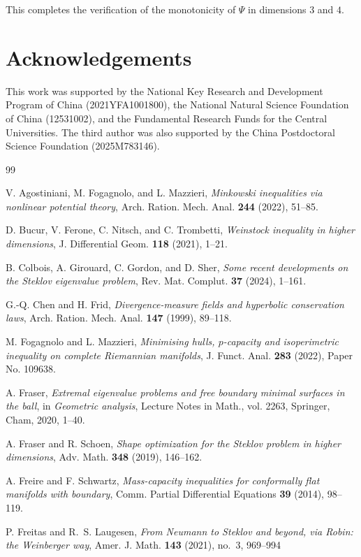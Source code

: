 \documentclass[11pt,reqno]{amsart}
\numberwithin{equation}{section}
\theoremstyle{definition}
\begin{document}
This completes the verification of the monotonicity of $\Psi$ in
dimensions $3$ and $4$.


\section*{Acknowledgements}
This work was supported by the National Key Research and Development Program of China (2021YFA1001800), the National Natural Science Foundation of China (12531002), and the Fundamental Research Funds for the Central Universities.  The third author was also supported by the China Postdoctoral Science Foundation (2025M783146).

\begin{thebibliography}{99}

V. Agostiniani, M. Fogagnolo, and L. Mazzieri,
\emph{Minkowski inequalities via nonlinear potential theory},
Arch. Ration. Mech. Anal. \textbf{244} (2022), 51--85.

D. Bucur, V. Ferone, C. Nitsch, and C. Trombetti,
\emph{Weinstock inequality in higher dimensions},
J. Differential Geom. \textbf{118} (2021), 1--21.

B. Colbois, A. Girouard, C. Gordon, and D. Sher,
\emph{Some recent developments on the Steklov eigenvalue problem},
Rev. Mat. Complut. \textbf{37} (2024), 1--161.

G.-Q. Chen and H. Frid,
\emph{Divergence-measure fields and hyperbolic conservation laws},
Arch. Ration. Mech. Anal. \textbf{147} (1999), 89--118.

M. Fogagnolo and L. Mazzieri,
\emph{Minimising hulls, $p$-capacity and isoperimetric inequality on complete Riemannian manifolds},
J. Funct. Anal. \textbf{283} (2022), Paper No. 109638.

A. Fraser,
\emph{Extremal eigenvalue problems and free boundary minimal surfaces in the ball},
in \emph{Geometric analysis}, Lecture Notes in Math., vol. 2263, Springer, Cham, 2020, 1--40.

A. Fraser and R. Schoen,
\emph{Shape optimization for the Steklov problem in higher dimensions},
Adv. Math. \textbf{348} (2019), 146--162.

A. Freire and F. Schwartz,
\emph{Mass-capacity inequalities for conformally flat manifolds with boundary},
Comm. Partial Differential Equations \textbf{39} (2014), 98--119.

P. Freitas and R.~S. Laugesen, \emph{From Neumann to Steklov and beyond, via Robin: the Weinberger way}, Amer. J. Math. {\bf 143} (2021), no.~3, 969--994


\end{thebibliography}
\end{document}

